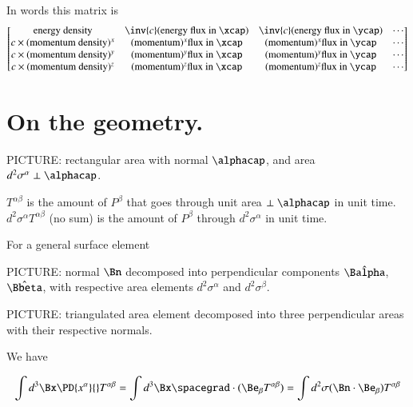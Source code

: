 In words this matrix is
\begin{equation}\label{eqn:relativisticElectrodynamicsL23:270}
\begin{bmatrix}
\text{energy density} & \inv{c} (\text{energy flux in $\xcap$}) & \inv{c} (\text{energy flux in $\ycap$}) &
\cdots \\
c \times (\text{momentum density})^x
& (\text{momentum})^x \text{flux in $\xcap$}
& (\text{momentum})^x \text{flux in $\ycap$}
& 
\cdots
\\
c \times (\text{momentum density})^y
& (\text{momentum})^y \text{flux in $\xcap$}
& (\text{momentum})^y \text{flux in $\ycap$}
& 
\cdots
\\
c \times (\text{momentum density})^z
& (\text{momentum})^z \text{flux in $\xcap$}
& (\text{momentum})^z \text{flux in $\ycap$}
& 
\cdots
\\
\end{bmatrix}
\end{equation}

\section{On the geometry.}

PICTURE: rectangular area with normal $\alphacap$, and area $d^2 \sigma^\alpha \perp \alphacap$.

$T^{\alpha\beta}$ is the amount of $P^\beta$ that goes through unit area $\perp \alphacap$ in unit time.  $d^2 \sigma^\alpha T^{\alpha \beta}$ (no sum) is the amount of $P^\beta$ through $d^2 \sigma^\alpha$ in unit time.

For a general surface element 

PICTURE: normal $\Bn$ decomposed into perpendicular components $\hat{\Balpha}$, $\hat{\Bbeta}$, with respective area elements $d^2 \sigma^\alpha$ and $d^2 \sigma^\beta$.  

PICTURE: triangulated area element decomposed into three perpendicular areas with their respective normals.

We have

\begin{equation}\label{eqn:relativisticElectrodynamicsL23:290}
\int d^3 \Bx \PD{x^\alpha}{} T^{\alpha\beta} = \int d^3 \Bx \spacegrad \cdot ( \Be_\beta T^{\alpha\beta} ) = \int d^2 \sigma (\Bn \cdot \Be_\beta) T^{\alpha \beta}
\end{equation}

